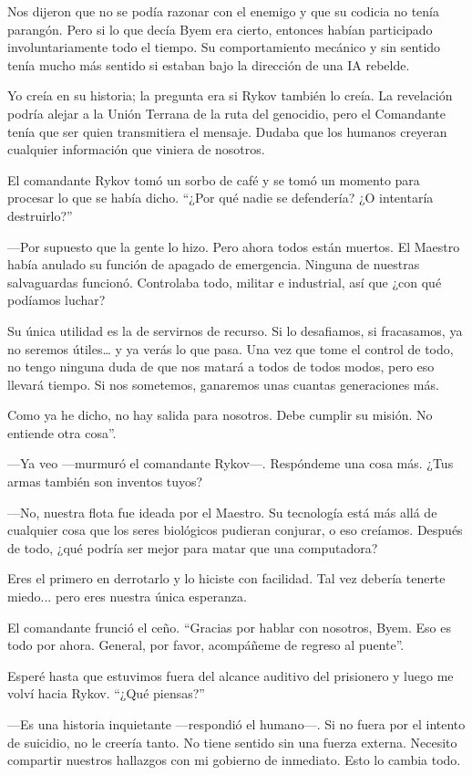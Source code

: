 Nos dijeron que no se podía razonar con el enemigo y que su codicia no tenía parangón. Pero si lo que decía Byem era cierto, entonces habían participado involuntariamente todo el tiempo. Su comportamiento mecánico y sin sentido tenía mucho más sentido si estaban bajo la dirección de una IA rebelde.

Yo creía en su historia; la pregunta era si Rykov también lo creía. La revelación podría alejar a la Unión Terrana de la ruta del genocidio, pero el Comandante tenía que ser quien transmitiera el mensaje. Dudaba que los humanos creyeran cualquier información que viniera de nosotros.

El comandante Rykov tomó un sorbo de café y se tomó un momento para procesar lo que se había dicho. “¿Por qué nadie se defendería? ¿O intentaría destruirlo?”

—Por supuesto que la gente lo hizo. Pero ahora todos están muertos. El Maestro había anulado su función de apagado de emergencia. Ninguna de nuestras salvaguardas funcionó. Controlaba todo, militar e industrial, así que ¿con qué podíamos luchar?

Su única utilidad es la de servirnos de recurso. Si lo desafiamos, si fracasamos, ya no seremos útiles… y ya verás lo que pasa. Una vez que tome el control de todo, no tengo ninguna duda de que nos matará a todos de todos modos, pero eso llevará tiempo. Si nos sometemos, ganaremos unas cuantas generaciones más.

Como ya he dicho, no hay salida para nosotros. Debe cumplir su misión. No entiende otra cosa”.

—Ya veo —murmuró el comandante Rykov—. Respóndeme una cosa más. ¿Tus armas también son inventos tuyos?

—No, nuestra flota fue ideada por el Maestro. Su tecnología está más allá de cualquier cosa que los seres biológicos pudieran conjurar, o eso creíamos. Después de todo, ¿qué podría ser mejor para matar que una computadora?

Eres el primero en derrotarlo y lo hiciste con facilidad. Tal vez debería tenerte miedo... pero eres nuestra única esperanza.

El comandante frunció el ceño. “Gracias por hablar con nosotros, Byem. Eso es todo por ahora. General, por favor, acompáñeme de regreso al puente”.

Esperé hasta que estuvimos fuera del alcance auditivo del prisionero y luego me volví hacia Rykov. “¿Qué piensas?”

—Es una historia inquietante —respondió el humano—. Si no fuera por el intento de suicidio, no le creería tanto. No tiene sentido sin una fuerza externa. Necesito compartir nuestros hallazgos con mi gobierno de inmediato. Esto lo cambia todo.

